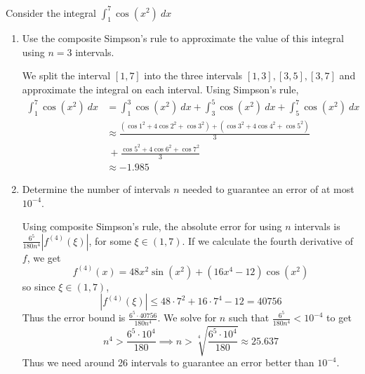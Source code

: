 \documentclass{eh-homework}
\begin{document}
    \begin{question}{3}
        Consider the integral \(\int _1^7 \cos (x^2)\ dx\)
        \begin{enumerate}[label=(\alph*)]
            \item Use the composite Simpson's rule to approximate the value of this integral using \(n=3\) intervals.
            
            We split the interval \([1,7]\) into the three intervals \([1,3], [3,5],[3,7]\) and approximate the integral on each interval. Using Simpson's rule,
            \begin{align*}
                \int _1^7 \cos (x^2)\ dx &= \int _1^3 \cos (x^2)\ dx + \int _3^5 \cos (x^2)\ dx + \int _5^7 \cos (x^2)\ dx \\
                &\approx \frac{(\cos 1^2 + 4 \cos 2^2 + \cos 3^2) + (\cos 3^2 + 4 \cos 4^2 + \cos 5^2)}{3} \\
                &\ + \frac{\cos 5^2 + 4 \cos 6^2 + \cos 7^2}{3} \\
                &\approx -1.985
            \end{align*}
            \item Determine the number of intervals \(n\) needed to guarantee an error of at most \(10^{-4}\).
            
            Using composite Simpson's rule, the absolute error for using \(n\) intervals is \(\frac{6^5}{180n^4}|f^{(4)}(\xi)|\), for some \(\xi \in (1,7)\). If we calculate the fourth derivative of \(f\), we get
            \[
                f^{(4)}(x) = 48x^2 \sin (x^2)+(16x^4 -12)\cos (x^2)
            \]
            so since \(\xi \in (1,7)\),
            \[
                |f^{(4)}(\xi)| \leq 48 \cdot 7^2 + 16 \cdot 7^4 - 12 = 40756
            \]
            Thus the error bound is \(\frac{6^5 \cdot 40756}{180n^4}\). We solve for \(n\) such that \(\frac{6^5}{180n^4} < 10^{-4}\) to get
            \[
                n^4 > \frac{6^5 \cdot 10^4}{180} \implies n > \sqrt[4]{\frac{6^5 \cdot 10^4}{180}} \approx 25.637
            \]
            Thus we need around 26 intervals to guarantee an error better than \(10^{-4}\).
        \end{enumerate}
    \end{question}
\end{document}
